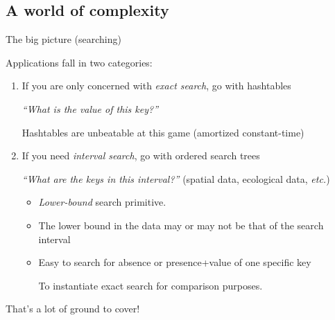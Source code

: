 \subsection{A world of complexity}

\begin{frame}[fragile]{The big picture (searching)}

  Applications fall in two categories:
  \begin{enumerate}
  \item If you are only concerned with {\em exact search}, go with hashtables

    {\em ``What is the value of this key?''}

    Hashtables are unbeatable at this game (amortized constant-time)
    
  \item If you need {\em interval search}, go with ordered search trees

    {\em ``What are the keys in this interval?''} (spatial data, ecological data, {\em etc.})

    \begin{itemize}
    \item {\em Lower-bound} search primitive.
    \item The lower bound in the data may or may not be that of the search interval
    \item Easy to search for absence or presence+value of one specific key

      To instantiate exact search for comparison purposes.
    \end{itemize}
  \end{enumerate}

  That's a lot of ground to cover!
  
\end{frame}


